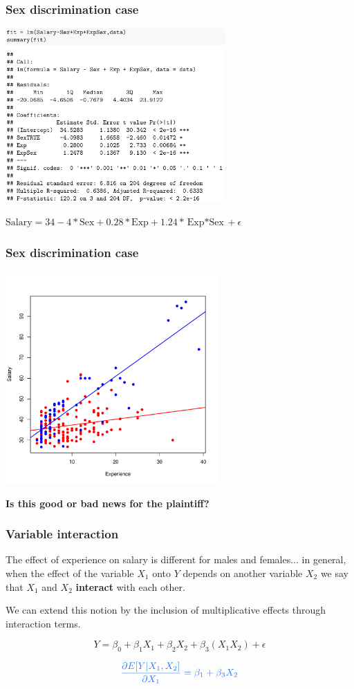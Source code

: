\documentclass{beamer}
\newcommand{\lb}[1]{\textcolor{lightblue}{#1}}
\newcommand{\sk}{\vspace{.5cm}}
\newcommand{\sko}{\vspace{.1in}}
\begin{document}
\begin{frame}
\frametitle{Sex discrimination case}


\sko	
\hspace*{8mm}\includegraphics[width=3.3in]{figures/sexMLR4}	

\sko
$
\text{Salary} = 34 - 4*\text{Sex}+ 0.28*\text{Exp} + 1.24*\text{Exp$*$Sex} + \epsilon
$
\end{frame}


\begin{frame}
\frametitle{Sex discrimination case}
\vspace{-1cm}
\begin{center}
\includegraphics[width=3.2in]{figures/SalaryExp_INT.pdf}
\end{center}
\vspace{-.5cm}
{\color{burntorange}\bf Is this good or bad news for the plaintiff?}

\end{frame}

\begin{frame}
\frametitle{Variable interaction}

The effect of experience on salary is different for males and females... in general, when the effect of the variable $X_1$ onto $Y$ depends on another variable  $X_2$ we say that $X_1$ and $X_2$ {\color{burntorange}\bf interact} with each other.
  
\sk
We can extend this notion by the inclusion of multiplicative 
effects through interaction terms.


$$
Y= \beta_0 + \beta_1 X_{1} + \beta_2 X_{2} + \beta_3(X_{1} X_{2}) + \epsilon
$$

$$
\lb{
\frac{\partial E[Y | X_1,X_2]}{\partial X_1} = \beta_1 + \beta_3 X_{2}}
$$

\end{frame}
\end{document}
